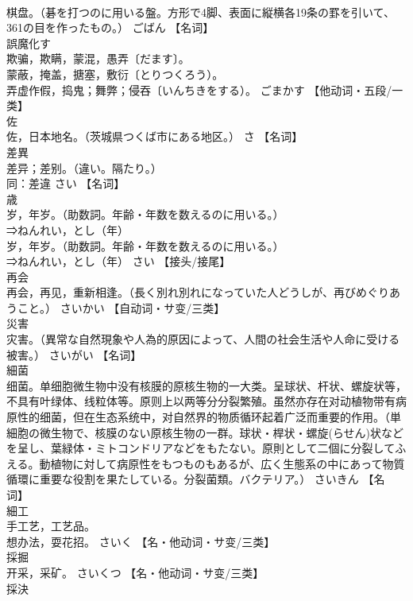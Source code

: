 \documentclass[8pt]{extreport}
\begin{document}
\begin{CJK}{UTF8}{min}
\\	棋盘。（碁を打つのに用いる盤。方形で4脚、表面に縦横各19条の罫を引いて、361の目を作ったもの。）	ごばん		【名词】
\\	誤魔化す	
\\	欺骗，欺瞒，蒙混，愚弄〔だます〕。 
\\	蒙蔽，掩盖，搪塞，敷衍〔とりつくろう）。 
\\	弄虚作假，捣鬼；舞弊；侵吞〔いんちきをする）。	ごまかす		【他动词・五段/一类】
\\	佐	
\\	佐，日本地名。（茨城県つくば市にある地区。）	さ		【名词】
\\	差異	
\\	差异；差别。（違い。隔たり。） 
\\	同：差違	さい		【名词】
\\	歳	
\\	岁，年岁。（助数詞。年齢・年数を数えるのに用いる。） 
\\	⇒ねんれい，とし（年） 
\\	岁，年岁。（助数詞。年齢・年数を数えるのに用いる。） 
\\	⇒ねんれい，とし（年）	さい		【接头/接尾】
\\	再会	
\\	再会，再见，重新相逢。（長く別れ別れになっていた人どうしが、再びめぐりあうこと。）	さいかい		【自动词・サ变/三类】
\\	災害	
\\	灾害。（異常な自然現象や人為的原因によって、人間の社会生活や人命に受ける被害。）	さいがい		【名词】
\\	細菌	
\\	细菌。单细胞微生物中没有核膜的原核生物的一大类。呈球状、杆状、螺旋状等，不具有叶绿体、线粒体等。原则上以两等分分裂繁殖。虽然亦存在对动植物带有病原性的细菌，但在生态系统中，对自然界的物质循环起着广泛而重要的作用。（単細胞の微生物で、核膜のない原核生物の一群。球状・桿状・螺旋(らせん)状などを呈し、葉緑体・ミトコンドリアなどをもたない。原則として二個に分裂してふえる。動植物に対して病原性をもつものもあるが、広く生態系の中にあって物質循環に重要な役割を果たしている。分裂菌類。バクテリア。）	さいきん		【名词】
\\	細工	
\\	手工艺，工艺品。 
\\	想办法，耍花招。	さいく		【名・他动词・サ变/三类】
\\	採掘	
\\	开采，采矿。	さいくつ		【名・他动词・サ变/三类】
\\	採決	

\end{CJK}
\end{document}

